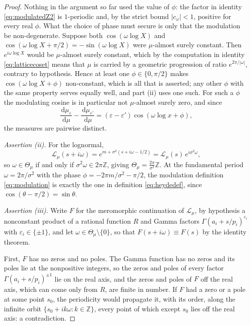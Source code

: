 \documentclass[sn-mathphys-num]{sn-jnl}
\theoremstyle{thmstyleone}%
\theoremstyle{thmstyletwo}%
\theoremstyle{thmstylethree}%
\theoremstyle{thmstyleone}%
\providecommand{\Z}{\mathbb{Z}}
\providecommand{\Leh}{\mathscr{L}}
\providecommand{\dd}{\,\mathrm{d}}
\begin{document}
\begin{appendices}
\begin{proof}
			Nothing in the argument so far used the value of $\phi$: the
			factor in identity \eqref{eq:modulatedZ2} is $1$-periodic and,
			by the strict bound $|c_\omega|<1$, positive for every real
			$\phi$. What the choice of phase must secure is only that the
			modulation be non-degenerate. Suppose both
			$\cos(\omega\log X)$ and $\cos(\omega\log X+\pi/2)
			=-\sin(\omega\log X)$ were $\mu$-almost surely constant. Then
			$e^{i\omega\log X}$ would be $\mu$-almost surely constant,
			which by the computation in identity \eqref{eq:latticecoset} means that
			$\mu$ is carried by a geometric progression of ratio
			$e^{2\pi/|\omega|}$, contrary to hypothesis. Hence at least one
			$\phi\in\{0,\pi/2\}$ makes $\cos(\omega\log X+\phi)$
			non-constant, which is all that is asserted; any other $\phi$
			with the same property serves equally well, and part (ii) uses
			one such. For such a $\phi$ the modulating cosine is in
			particular not $\mu$-almost surely zero, and since
			\begin{equation}\label{eq:distinctness}
				\frac{\dd\mu_\varepsilon}{\dd\mu}
				-\frac{\dd\mu_{\varepsilon'}}{\dd\mu}
				=(\varepsilon-\varepsilon')\cos(\omega\log x+\phi),
			\end{equation}
			the measures are pairwise distinct.
			
			\emph{Assertion (ii).} For the lognormal,
			\begin{equation}\label{eq:lognormalperiod}
				\Leh_\mu(s+i\omega)
				=e^{m+\sigma^2(s+i\omega-1/2)}
				=\Leh_\mu(s)\,e^{i\sigma^2\omega},
			\end{equation}
			so $\omega\in\Theta_\mu$ if and only if
			$\sigma^2\omega\in2\pi\Z$, giving
			$\Theta_\mu=\tfrac{2\pi}{\sigma^2}\Z$. At the fundamental period
			$\omega=2\pi/\sigma^2$ with the phase
			$\phi=-2\pi m/\sigma^2-\pi/2$, the modulation
			definition \eqref{eq:modulation} is exactly the one in
			definition \eqref{eq:heydedef}, since
			$\cos(\theta-\pi/2)=\sin\theta$.
			
			\emph{Assertion (iii).} Write $F$ for the meromorphic
			continuation of $\Leh_\mu$, by hypothesis a nonconstant
			product of a rational function $R$ and Gamma factors
			$\Gamma(a_i+s/p_i)^{\varepsilon_i}$ with
			$\varepsilon_i\in\{\pm1\}$, and let
			$\omega\in\Theta_\mu\setminus\{0\}$, so that
			$F(s+i\omega)\equiv F(s)$ by the identity theorem.
			
			First, $F$ has no zeros and no poles. The Gamma function has
			no zeros and its poles lie at the nonpositive integers, so
			the zeros and poles of every factor
			$\Gamma(a_i+s/p_i)^{\pm1}$ lie on the real axis, and the
			zeros and poles of $F$ off the real axis, which can come
			only from $R$, are finite in number. If $F$ had a zero or a
			pole at some point $s_0$, the periodicity would propagate
			it, with its order, along the infinite orbit
			$\{s_0+ik\omega:k\in\Z\}$, every point of which except
			$s_0$ lies off the real axis: a contradiction.
			

\end{proof}
\end{appendices}
\end{document}
